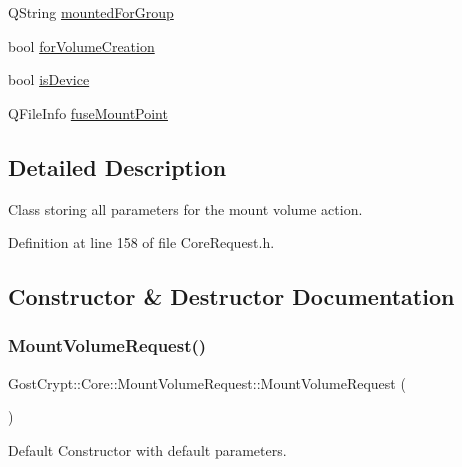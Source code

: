 \begin{DoxyCompactItemize}
\item 
Q\+String \hyperlink{struct_gost_crypt_1_1_core_1_1_mount_volume_request_a5180a30572a910adb0750ce7a3ecc016}{mounted\+For\+Group}
\item 
bool \hyperlink{struct_gost_crypt_1_1_core_1_1_mount_volume_request_ace199165f29bbb7c9eca0abd5ce4e183}{for\+Volume\+Creation}
\item 
bool \hyperlink{struct_gost_crypt_1_1_core_1_1_mount_volume_request_ad56e4661f589cbe8e9e861fc139787da}{is\+Device}
\item 
Q\+File\+Info \hyperlink{struct_gost_crypt_1_1_core_1_1_mount_volume_request_a592dd05d50e4815aa3556ad9f61197c3}{fuse\+Mount\+Point}
\end{DoxyCompactItemize}


\subsection{Detailed Description}
Class storing all parameters for the mount volume action. 

Definition at line 158 of file Core\+Request.\+h.



\subsection{Constructor \& Destructor Documentation}
\mbox{\label{struct_gost_crypt_1_1_core_1_1_mount_volume_request_aeec55651b6e63c80351c2dd406b63b90}} 
\subsubsection{\texorpdfstring{Mount\+Volume\+Request()}{MountVolumeRequest()}}
{\footnotesize\ttfamily Gost\+Crypt\+::\+Core\+::\+Mount\+Volume\+Request\+::\+Mount\+Volume\+Request (\begin{DoxyParamCaption}{ }\end{DoxyParamCaption})}



Default Constructor with default parameters. 



